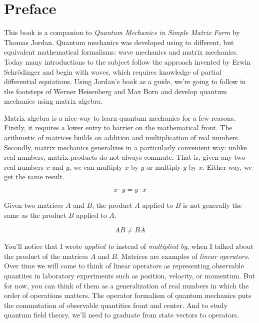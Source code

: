 \chapter{Preface}

This book is a companion to \emph{Quantum Mechanics in Simple Matrix Form} \cite{Jordan2005} by Thomas Jordan. Quantum mechanics was developed using to different, but equivalent mathematical formalisms: wave mechanics and matrix mechanics. Today many introductions to the subject follow the approach invented by Erwin Schr\"odinger and begin with waves, which requires knowledge of partial differential equiations. Using Jordan's book as a guide, we're going to follow in the footsteps of Werner Heisenberg and Max Born and develop quantum mechanics using matrix algebra.

Matrix algebra is a nice way to learn quantum mechanics for a few reasons. Firstly, it requires a lower entry to barrier on the mathematical front. The arithmetic of matrices builds on addition and multiplication of real numbers. Secondly, matrix mechanics generalizes in a particularly convenient way: unlike real numbers, matrix products do not always commute.  That is, given any two real numbers $x$ and $y$, we can multiply $x$ by $y$ or multiply $y$ by $x$. Either way, we get the same result.

$$ x\cdot y = y \cdot x $$

Given two matrices $A$ and $B$, the product $A$ applied to $B$ is not generally the same as the product $B$ applied to $A$.

$$ AB \neq BA $$

You'll notice that I wrote \emph{applied to} instead of \emph{multiplied by}, when I talked about the product of the matrices $A$ and $B$. Matrices are examples of \emph{linear operators}. Over time we will come to think of linear operators as representing observable quantites in laboratory experiments such as position, velocity, or momentum. But for now, you can think of them as a generalization of real numbers in which the order of operations matters. The operator formalism of quantum mechanics puts the commutation of observable quantities front and center. And to study quantum field theory, we'll need to graduate from state vectors to operators.

